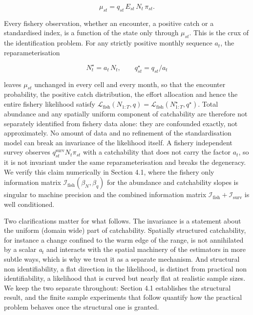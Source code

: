 \documentclass[
  11pt,
  a4paper,
]{article}
\begin{document}
\begin{equation}
\mu_{st} = q_{st}\,E_{st}\,N_t\,\pi_{st}.
\end{equation}

\noindent Every fishery observation, whether an encounter, a positive catch or a
standardised index, is a function of the state only through
\(\mu_{st}\). This is the crux of the identification problem. For any
strictly positive monthly sequence \(a_t\), the reparameterisation

\begin{equation}
N_t^{\star} = a_t\,N_t, \qquad q_{st}^{\star} = q_{st} / a_t
\end{equation}

\noindent leaves \(\mu_{st}\) unchanged in every cell and every month, so that the
encounter probability, the positive catch distribution, the effort
allocation and hence the entire fishery likelihood satisfy
\(\mathcal{L}_{\text{fish}}(N_{1:T}, q) = \mathcal{L}_{\text{fish}}(N_{1:T}^{\star}, q^{\star})\).
Total abundance and any spatially uniform component of catchability are
therefore not separately identified from fishery data alone: they are
confounded exactly, not approximately. No amount of data and no
refinement of the standardisation model can break an invariance of the
likelihood itself. A fishery independent survey observes
\(q^{\text{surv}}_{st} N_t \pi_{st}\) with a catchability that does not
carry the factor \(a_t\), so it is not invariant under the same
reparameterisation and breaks the degeneracy. We verify this claim
numerically in Section 4.1, where the fishery only information matrix
\(\mathcal{I}_{\text{fish}}(\beta_N, \beta_q)\) for the abundance and
catchability slopes is singular to machine precision and the combined
information matrix
\(\mathcal{I}_{\text{fish}} + \mathcal{I}_{\text{surv}}\) is well
conditioned.

Two clarifications matter for what follows. The invariance is a
statement about the uniform (domain wide) part of catchability.
Spatially structured catchability, for instance a change confined to the
warm edge of the range, is not annihilated by a scalar \emph{a}\(_{t}\)
and interacts with the spatial machinery of the estimators in more
subtle ways, which is why we treat it as a separate mechanism. And
structural non identifiability, a flat direction in the likelihood, is
distinct from practical non identifiability, a likelihood that is curved
but nearly flat at realistic sample sizes. We keep the two separate
throughout: Section 4.1 establishes the structural result, and the
finite sample experiments that follow quantify how the practical problem
behaves once the structural one is granted.
\end{document}
